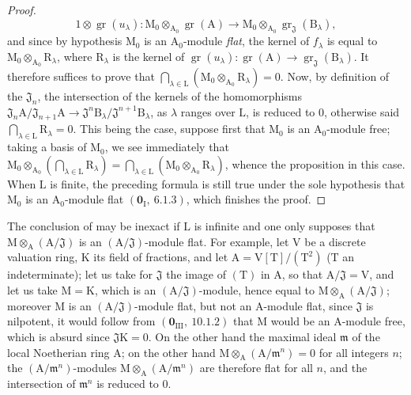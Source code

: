 \begin{proof}
\[
1\otimes\operatorname{gr}(u_\lambda) : \mathrm{M}_0\otimes_{\mathrm{A}_0}\operatorname{gr}(\mathrm{A}) \to \mathrm{M}_0\otimes_{\mathrm{A}_0}\operatorname{gr}_\mathfrak{J}(\mathrm{B}_\lambda),
\]
and since by hypothesis $\mathrm{M}_0$ is an $\mathrm{A}_0$-module \emph{flat}, the kernel of $f_\lambda$ is equal to $\mathrm{M}_0\otimes_{\mathrm{A}_0}\mathrm{R}_\lambda$,
where $\mathrm{R}_\lambda$ is the kernel of $\operatorname{gr}(u_\lambda):\operatorname{gr}(\mathrm{A})\to\operatorname{gr}_\mathfrak{J}(\mathrm{B}_\lambda)$. It therefore suffices to prove that
$\bigcap_{\lambda\in\mathrm{L}}(\mathrm{M}_0\otimes_{\mathrm{A}_0}\mathrm{R}_\lambda)=0$. Now, by definition of the $\mathfrak{J}_n$, the intersection of the kernels of the homomorphisms
$\mathfrak{J}_n\mathrm{A}/\mathfrak{J}_{n+1}\mathrm{A}\to\mathfrak{J}^n\mathrm{B}_\lambda/\mathfrak{J}^{n+1}\mathrm{B}_\lambda$, as $\lambda$ ranges over $\mathrm{L}$, is reduced to $0$, otherwise
said $\bigcap_{\lambda\in\mathrm{L}}\mathrm{R}_\lambda=0$. This being the case, suppose first that $\mathrm{M}_0$ is an $\mathrm{A}_0$-module free; taking
a basis of $\mathrm{M}_0$, we see immediately that $\mathrm{M}_0\otimes_{\mathrm{A}_0}(\bigcap_{\lambda\in\mathrm{L}}\mathrm{R}_\lambda)=\bigcap_{\lambda\in\mathrm{L}}(\mathrm{M}_0\otimes_{\mathrm{A}_0}\mathrm{R}_\lambda)$, whence the
proposition in this case. When $\mathrm{L}$ is finite, the preceding formula is still true under
the sole hypothesis that $\mathrm{M}_0$ is an $\mathrm{A}_0$-module flat $(\mathbf{0}_\mathrm{I},~6.1.3)$, which finishes the
proof.
\end{proof}

\begin{remark}[11.4.2]
\label{IV.11.4.2}
The conclusion of  may be inexact if $\mathrm{L}$ is infinite
and one only supposes that $\mathrm{M}\otimes_\mathrm{A}(\mathrm{A}/\mathfrak{J})$ is an $(\mathrm{A}/\mathfrak{J})$-module flat. For example,
let $\mathrm{V}$ be a discrete valuation ring, $\mathrm{K}$ its field of fractions, and let $\mathrm{A}=\mathrm{V}[\mathrm{T}]/(\mathrm{T}^2)$
($\mathrm{T}$ an indeterminate); let us take for $\mathfrak{J}$ the image of $(\mathrm{T})$ in $\mathrm{A}$, so that $\mathrm{A}/\mathfrak{J}=\mathrm{V}$, and
let us take $\mathrm{M}=\mathrm{K}$, which is an $(\mathrm{A}/\mathfrak{J})$-module, hence equal to $\mathrm{M}\otimes_\mathrm{A}(\mathrm{A}/\mathfrak{J})$; moreover $\mathrm{M}$ is
an $(\mathrm{A}/\mathfrak{J})$-module flat, but not an $\mathrm{A}$-module flat, since $\mathfrak{J}$ is nilpotent, it
would follow from $(\mathbf{0}_{\mathrm{III}},~10.1.2)$ that $\mathrm{M}$ would be an $\mathrm{A}$-module free, which is absurd
since $\mathfrak{J}\mathrm{K}=0$. On the other hand the maximal ideal $\mathfrak{m}$ of the local Noetherian
ring $\mathrm{A}$; on the other hand $\mathrm{M}\otimes_\mathrm{A}(\mathrm{A}/\mathfrak{m}^n)=0$ for all integers $n$; the $(\mathrm{A}/\mathfrak{m}^n)$-modules
$\mathrm{M}\otimes_\mathrm{A}(\mathrm{A}/\mathfrak{m}^n)$ are therefore flat for all $n$, and the intersection of $\mathfrak{m}^n$ is reduced to $0$.
\end{remark}

